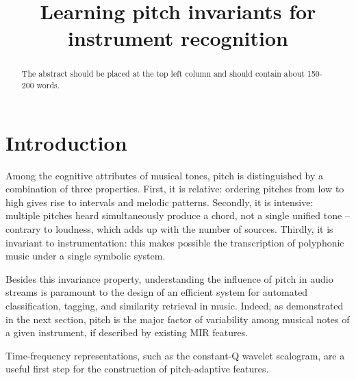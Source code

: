 \documentclass{article}
\title{Learning pitch invariants for instrument recognition}
\begin{document}
%
\maketitle
%
\begin{abstract}
The abstract should be placed at the top left column and should contain about 150-200 words.
\end{abstract}
%

\section{Introduction}\label{sec:introduction}
Among the cognitive attributes of musical tones, pitch is distinguished by a combination of three properties.
First, it is relative: ordering pitches from low to high gives rise to intervals and melodic patterns.
Secondly, it is intensive: multiple pitches heard simultaneously produce a chord, not a single unified tone -- contrary to loudness, which adds up with the number of sources.
Thirdly, it is invariant to instrumentation: this makes possible the transcription of polyphonic music under a single symbolic system. 

Besides this invariance property, understanding the influence of pitch in audio streams is paramount to the design of an efficient system for automated classification, tagging, and similarity retrieval in music. 
Indeed, as demonstrated in the next section, pitch is the major factor of variability among musical notes of a given instrument, if described by existing MIR features.

Time-frequency representations, such as the constant-Q wavelet scalogram, are a useful first step for the construction of pitch-adaptive features.






\end{document}
